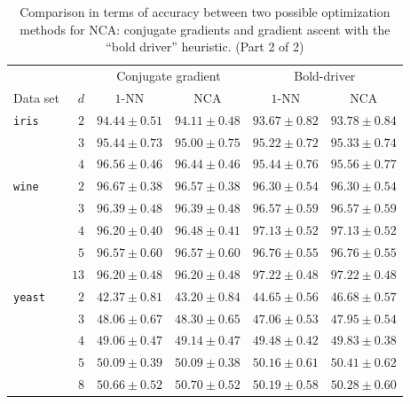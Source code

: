   \begin{table}
  \centering
    \begin{tabular}{lrcccc}
    \toprule
	    &     & \multicolumn{2}{c}{Conjugate gradient}  & \multicolumn{2}{c}{Bold-driver}\\
    \cmidrule(r){3-4} \cmidrule(r){5-6}
    Data set & $d$ & $1$-NN & NCA & $1$-NN & NCA \\
    \midrule
      \texttt{iris}&$2$&$94.44 \pm 0.51$&$94.11 \pm 0.48$&$93.67 \pm 0.82$&$93.78 \pm 0.84$\\ 
      &$3$&$95.44 \pm 0.73$&$95.00 \pm 0.75$&$95.22 \pm 0.72$&$95.33 \pm 0.74$\\ 
      &$4$&$96.56 \pm 0.46$&$96.44 \pm 0.46$&$95.44 \pm 0.76$&$95.56 \pm 0.77$\\ 
      \midrule
      \texttt{wine}&$2$&$96.67 \pm 0.38$&$96.57 \pm 0.38$&$96.30 \pm 0.54$&$96.30 \pm 0.54$\\ 
      &$3$&$96.39 \pm 0.48$&$96.39 \pm 0.48$&$96.57 \pm 0.59$&$96.57 \pm 0.59$\\ 
      &$4$&$96.20 \pm 0.40$&$96.48 \pm 0.41$&$97.13 \pm 0.52$&$97.13 \pm 0.52$\\ 
      &$5$&$96.57 \pm 0.60$&$96.57 \pm 0.60$&$96.76 \pm 0.55$&$96.76 \pm 0.55$\\ 
      &$13$&$96.20 \pm 0.48$&$96.20 \pm 0.48$&$97.22 \pm 0.48$&$97.22 \pm 0.48$\\ 
      \midrule
      \texttt{yeast}&$2$&$42.37 \pm 0.81$&$43.20 \pm 0.84$&$44.65 \pm 0.56$&$46.68 \pm 0.57$\\ 
      &$3$&$48.06 \pm 0.67$&$48.30 \pm 0.65$&$47.06 \pm 0.53$&$47.95 \pm 0.54$\\ 
      &$4$&$49.06 \pm 0.47$&$49.14 \pm 0.47$&$49.48 \pm 0.42$&$49.83 \pm 0.38$\\ 
      &$5$&$50.09 \pm 0.39$&$50.09 \pm 0.38$&$50.16 \pm 0.61$&$50.41 \pm 0.62$\\ 
      &$8$&$50.66 \pm 0.52$&$50.70 \pm 0.52$&$50.19 \pm 0.58$&$50.28 \pm 0.60$\\ 
    \bottomrule
    \end{tabular}
  \caption[Accuracy for NCA optimized with conjugate gradient method and gradient ascent with ``bold driver'' heuristic (part 2 of 2)]{Comparison in terms of accuracy between two possible optimization methods for NCA: conjugate gradients and gradient ascent with the ``bold driver'' heuristic. (Part 2 of 2)}
  \label{table:comp-opts-2}
  \end{table}


